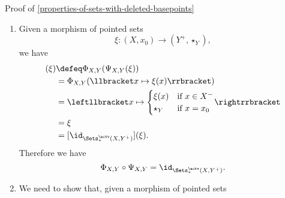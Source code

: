 \begin{Proof}{Proof of \cref{properties-of-sets-with-deleted-basepoints}}
\begin{enumerate}
\begin{align*}
                                                 &\defeq \Psi_{X,Y}(\leftllbracket x\mapsto{\begin{cases}\xi(x)&\text{if $x\in X^{-}$}\\\star_{Y}&\text{if $x=x_{0}$}\end{cases}}\rightrrbracket)\\%
                                                 &=      \llbracket x\mapsto\xi(x)\rrbracket\\
                                                 &=      \xi\\
                                                 &=      [\id_{\Sets(X^{-},Y)}](\xi).
            \end{align*}
            Therefore we have
            \[
                \Psi_{X,Y}\circ\Phi_{X,Y}%
                =%
                \id_{\Sets(X^{-},Y)}.%
            \]%
        \item\label{proof-of-properties-of-sets-with-deleted-basepoints-adjoint-equivalence-4}Given a morphism of pointed sets
            \[
                \xi%
                \colon%
                (X,x_{0})%
                \to%
                (Y^{+},\star_{Y}),%
            \]%
            we have
            \begin{align*}
                [\Phi_{X,Y}\circ\Psi_{X,Y}](\xi) &\defeq \Phi_{X,Y}(\Psi_{X,Y}(\xi))\\%
                                                 &=      \Phi_{X,Y}(\llbracket x\mapsto\xi(x)\rrbracket)\\%
                                                 &=      \leftllbracket x\mapsto{\begin{cases}\xi(x)&\text{if $x\in X^{-}$}\\\star_{Y}&\text{if $x=x_{0}$}\end{cases}}\rightrrbracket\\
                                                 &=      \xi\\
                                                 &=      [\id_{\Sets^{\actv}_{*}(X,Y^{+})}](\xi).
            \end{align*}
            Therefore we have
            \[
                \Phi_{X,Y}\circ\Psi_{X,Y}%
                =%
                \id_{\Sets^{\actv}_{*}(X,Y^{+})}.%
            \]%
        \item\label{proof-of-properties-of-sets-with-deleted-basepoints-adjoint-equivalence-5}We need to show that, given a morphism of pointed sets

\end{enumerate}
\end{Proof}
